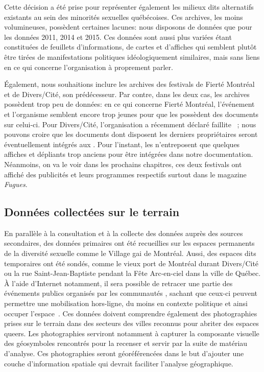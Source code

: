Cette décision a été prise pour représenter également les milieux dits alternatifs existants au sein des minorités sexuelles québécoises.
Ces archives, les moins volumineuses, possèdent certaines lacunes: nous disposons de données que pour les données 2011, 2014 et 2015.
Ces données sont aussi plus variées étant constituées de feuillets d'informations, de cartes et d'affiches qui semblent plutôt être tirées de manifestations politiques idéologiquement similaires, mais sans liens en ce qui concerne l'organisation à proprement parler.

Également, nous souhaitions inclure les archives des festivals de Fierté Montréal et de Divers/Cité, son prédécesseur.
Par contre, dans les deux cas, les archives possèdent trop peu de données: en ce qui concerne Fierté Montréal, l'événement et l'organisme semblent encore trop jeunes pour que les \agq{} possèdent des documents sur celui-ci.
Pour Divers/Cité, l'organisation a récemment déclaré faillite~\citep{Cormier2015} ; nous pouvons croire que les documents dont disposent les derniers propriétaires seront éventuellement intégrés aux \agq{}.
Pour l'instant, les \agq{} n'entreposent que quelques affiches et dépliants trop anciens pour être intégrées dans notre documentation.
Néanmoins, on va le voir dans les prochains chapitres, ces deux festivals ont affiché des publicités et leurs programmes respectifs surtout dans le magazine \emph{Fugues}.

\subsection{Données collectées sur le terrain}
\label{sub:donnees_collectees_sur_le_terrain}
En parallèle à la consultation et à la collecte des données auprès des sources secondaires, des données primaires ont été recueillies sur les espaces permanents de la diversité sexuelle comme le Village gai de Montréal.
Aussi, des espaces dits temporaires ont été sondés, comme le vieux port de Montréal durant Divers/Cité ou la rue Saint-Jean-Baptiste pendant la Fête Arc-en-ciel dans la ville de Québec.
À l'aide d'Internet notamment, il sera possible de retracer une partie des événements publics organisés par les communautés \lgbt{}, sachant que ceux-ci peuvent permettre une mobilisation hors-ligne, du moins en contexte politique et ainsi occuper l'espace~\citep[153-154]{Mercea2011}.
Ces données doivent comprendre également des photographies prises sur le terrain dans des secteurs des villes reconnus pour abriter des espaces queers.
Les photographies serviront notamment à capturer la composante visuelle des géosymboles rencontrés pour la recenser et servir par la suite de matériau d'analyse.
Ces photographies seront géoréférencées dans le but d'ajouter une couche d'information spatiale qui devrait faciliter l'analyse géographique.

